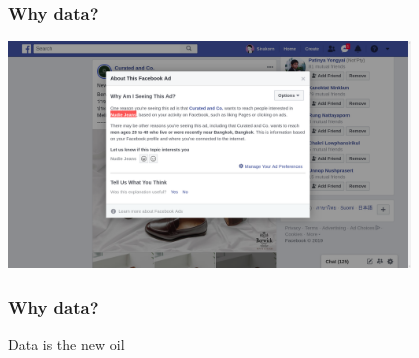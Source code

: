 \documentclass[aspectratio=169]{beamer}
\begin{document}
\begin{frame}
    \frametitle{Why data?}
    \centering
    \includegraphics[width=0.8\textwidth]{images/facebook-ads-details.png}
\end{frame}

\begin{frame}
    \frametitle{Why data?}
    \centering
    \Huge Data is the new oil
\end{frame}
\end{document}
